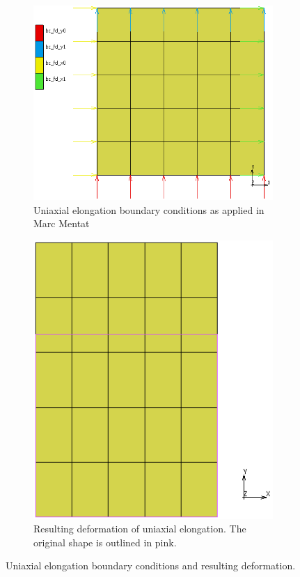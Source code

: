\begin{figure}[H]
	\centering
	\begin{subfigure}[b]{0.45\textwidth}
		\centering
		\includegraphics[width=\textwidth]{C1BC.png}
		\caption{Uniaxial elongation boundary conditions as applied in Marc Mentat}
		\label{fig:c1bc}
	\end{subfigure}
	\hfill
	\begin{subfigure}[b]{0.4\textwidth}
		\centering
		\includegraphics[width=\textwidth]{C1Def.png}
		\caption{Resulting deformation of uniaxial elongation. The original shape is outlined in pink.}
		\label{fig:c1def}
	\end{subfigure}
	\caption[Uniaxial elongation boundary conditions and deformation]{Uniaxial elongation boundary conditions and resulting deformation.}
	\label{fig:c1}
\end{figure}

